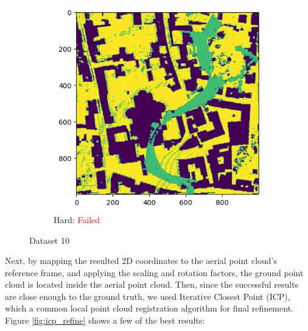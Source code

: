 \documentclass[11pt]{article}
\begin{document}
\begin{figure}[p]
        \vspace{1em}

        \begin{subfigure}{0.45\textwidth}
            \centering
            \includegraphics[width=\linewidth]{images/full/hard/5_2_3_hard}
            \caption{Hard: \textcolor{red}{Failed}}
            \label{fig:5_2_3_hard}
        \end{subfigure}
        \hfill

        \caption{Dataset 10}
        \label{fig:res_5_2_3}
    \end{figure}

    \clearpage

    Next, by mapping the resulted 2D coordinates to the aerial point cloud's reference frame, and applying the scaling
    and rotation factors, the ground point cloud is located inside the aerial point cloud. Then, since the successful results
    are close enough to the ground truth, we used Iterative Closest Point (ICP), which a common local point cloud
    registration algorithm for final refinement. Figure \ref{fig:icp_refine} shows a few of the best results:
\end{document}
